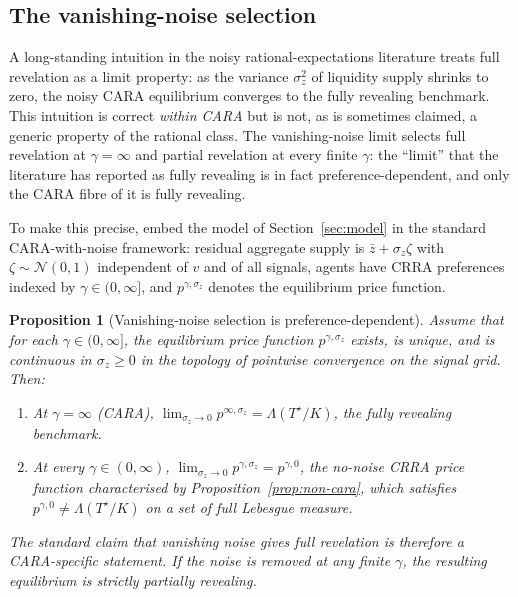 \documentclass[12pt,letterpaper]{article}
\newtheorem{proposition}{Proposition}
\theoremstyle{definition}
\theoremstyle{remark}
\newcommand{\Lam}{\Lambda}            %
\newcommand{\Tstar}{T^{\!\star}}
\newcommand{\1}{\mathbf{1}}
\begin{document}
\subsection{The vanishing-noise selection}\label{sec:vanishing-noise}

A long-standing intuition in the noisy rational-expectations literature
treats full revelation as a limit property: as the variance $\sigma_{z}^{2}$
of liquidity supply shrinks to zero, the noisy CARA equilibrium converges
to the fully revealing benchmark. This intuition is correct \emph{within
CARA} but is not, as is sometimes claimed, a generic property of the
rational class. The vanishing-noise limit selects full revelation at
$\gamma=\infty$ and partial revelation at every finite $\gamma$: the
``limit'' that the literature has reported as fully revealing is in fact
preference-dependent, and only the CARA fibre of it is fully revealing.

To make this precise, embed the model of Section~\ref{sec:model} in the
standard CARA-with-noise framework: residual aggregate supply is
$\bar z + \sigma_{z}\zeta$ with $\zeta\sim\mathcal{N}(0,1)$ independent
of $v$ and of all signals, agents have CRRA preferences indexed by
$\gamma\in(0,\infty]$, and $p^{\gamma,\sigma_{z}}$ denotes the equilibrium
price function.

\begin{proposition}[Vanishing-noise selection is preference-dependent]\label{prop:vanishing}
Assume that for each $\gamma\in(0,\infty]$, the equilibrium price function
$p^{\gamma,\sigma_{z}}$ exists, is unique, and is continuous in
$\sigma_{z}\geq 0$ in the topology of pointwise convergence on the signal
grid. Then:
\begin{enumerate}[label=\textnormal{(\roman*)},topsep=2pt,itemsep=2pt]
\item At $\gamma=\infty$ (CARA),
$\lim_{\sigma_{z}\to 0}p^{\infty,\sigma_{z}}=\Lam(\Tstar/K)$, the fully
revealing benchmark.
\item At every $\gamma\in(0,\infty)$,
$\lim_{\sigma_{z}\to 0}p^{\gamma,\sigma_{z}}=p^{\gamma,0}$, the no-noise
CRRA price function characterised by Proposition~\ref{prop:non-cara},
which satisfies $p^{\gamma,0}\neq\Lam(\Tstar/K)$ on a set of full
Lebesgue measure.
\end{enumerate}
The standard claim that vanishing noise gives full revelation is therefore
a CARA-specific statement. If the noise is removed at any finite
$\gamma$, the resulting equilibrium is strictly partially revealing.
\end{proposition}
\end{document}
